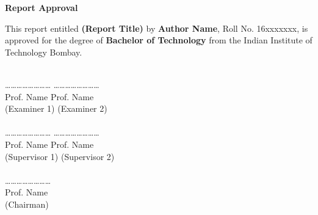 \documentclass[12pt, a4paper, twoside, openright]{Thesis} %
\begin{document}
{

\vspace{-1in}
\begin{center}
{\Large  {\bf Report Approval}}
\end{center}
\vspace*{0.1in} \noindent This report entitled {\large \bf (Report Title)} by {\bf \large
Author Name}, Roll No. 16xxxxxxx, is approved for the degree of {\large \bf Bachelor of Technology} from the Indian Institute of Technology Bombay.\\\\

\vspace{3cm}

 \ldots\ldots \ldots\ldots \ldots\ldots \ldots\ldots  \hspace{2.5in}  \ldots\ldots \ldots\ldots \ldots\ldots \ldots\ldots \\
 \hspace*{1cm} Prof. Name \hspace{3.4in} Prof. Name\\
 \hspace*{0.9cm} (Examiner 1) \hspace{3.3in} (Examiner 2)\\\\


 \ldots\ldots \ldots\ldots \ldots\ldots \ldots\ldots  \hspace{2.5in}  \ldots\ldots \ldots\ldots \ldots\ldots \ldots\ldots \\
 \hspace*{1cm} Prof. Name \hspace{3.4in} Prof. Name\\
 \hspace*{0.9cm} (Supervisor 1) \hspace{3.2in} (Supervisor 2)\\\\


 \ldots\ldots \ldots\ldots \ldots\ldots \ldots\ldots\\
  \hspace*{1cm} Prof. Name\\
 \hspace*{1cm} (Chairman)\\\\

}
\end{document}
